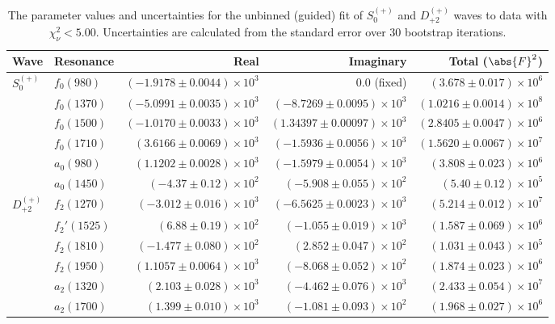 \begin{table}[ht]
    \begin{center}
        \begin{tabular}{llrrr}\toprule
        Wave & Resonance & Real & Imaginary & Total ($\abs{F}^2$) \\\midrule
$S_{0}^{(+)}$ & $f_{0}(980)$ & $(-1.9178 \pm 0.0044) \times 10^{3}$ & $0.0$ (fixed) & $(3.678 \pm 0.017) \times 10^{6}$ \\
 & $f_{0}(1370)$ & $(-5.0991 \pm 0.0035) \times 10^{3}$ & $(-8.7269 \pm 0.0095) \times 10^{3}$ & $(1.0216 \pm 0.0014) \times 10^{8}$ \\
 & $f_{0}(1500)$ & $(-1.0170 \pm 0.0033) \times 10^{3}$ & $(1.34397 \pm 0.00097) \times 10^{3}$ & $(2.8405 \pm 0.0047) \times 10^{6}$ \\
 & $f_{0}(1710)$ & $(3.6166 \pm 0.0069) \times 10^{3}$ & $(-1.5936 \pm 0.0056) \times 10^{3}$ & $(1.5620 \pm 0.0067) \times 10^{7}$ \\
 & $a_{0}(980)$ & $(1.1202 \pm 0.0028) \times 10^{3}$ & $(-1.5979 \pm 0.0054) \times 10^{3}$ & $(3.808 \pm 0.023) \times 10^{6}$ \\
 & $a_{0}(1450)$ & $(-4.37 \pm 0.12) \times 10^{2}$ & $(-5.908 \pm 0.055) \times 10^{2}$ & $(5.40 \pm 0.12) \times 10^{5}$ \\
$D_{+2}^{(+)}$ & $f_{2}(1270)$ & $(-3.012 \pm 0.016) \times 10^{3}$ & $(-6.5625 \pm 0.0023) \times 10^{3}$ & $(5.214 \pm 0.012) \times 10^{7}$ \\
 & $f_{2}'(1525)$ & $(6.88 \pm 0.19) \times 10^{2}$ & $(-1.055 \pm 0.019) \times 10^{3}$ & $(1.587 \pm 0.069) \times 10^{6}$ \\
 & $f_{2}(1810)$ & $(-1.477 \pm 0.080) \times 10^{2}$ & $(2.852 \pm 0.047) \times 10^{2}$ & $(1.031 \pm 0.043) \times 10^{5}$ \\
 & $f_{2}(1950)$ & $(1.1057 \pm 0.0064) \times 10^{3}$ & $(-8.068 \pm 0.052) \times 10^{2}$ & $(1.874 \pm 0.023) \times 10^{6}$ \\
 & $a_{2}(1320)$ & $(2.103 \pm 0.028) \times 10^{3}$ & $(-4.462 \pm 0.076) \times 10^{3}$ & $(2.433 \pm 0.054) \times 10^{7}$ \\
 & $a_{2}(1700)$ & $(1.399 \pm 0.010) \times 10^{3}$ & $(-1.081 \pm 0.093) \times 10^{2}$ & $(1.968 \pm 0.027) \times 10^{6}$ \\\bottomrule
        \end{tabular}
    \caption{The parameter values and uncertainties for the unbinned (guided) fit of $S_{0}^{(+)}$ and $D_{+2}^{(+)}$ waves to data with $\chi^2_\nu < 5.00$. Uncertainties are calculated from the standard error over $30$ bootstrap iterations.}\label{tab:unbinned-fit-chisqdof-5.0-guided-Sp0p-Dp2p}
    \end{center}
\end{table}
